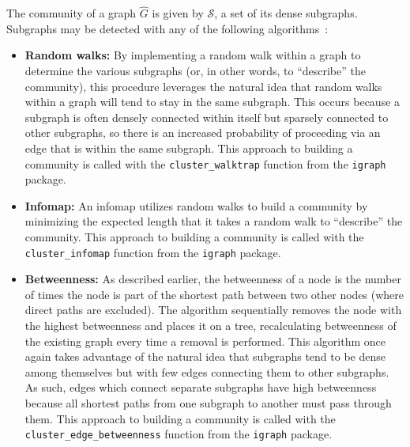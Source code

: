 The community of a graph $\hat{G}$ is given by $\mathcal{S}$, a set of its 
dense subgraphs. Subgraphs may be detected with any of the following 
algorithms~\cite{igraph}:

\tablespacing
\begin{itemize}
	\item \textbf{Random walks:} 
	By implementing a random walk within a graph 
	to determine the various subgraphs (or, in other words, to ``describe'' the 
	community), this procedure leverages the natural idea 
	that random walks within a graph will tend to stay in the same subgraph. 
	This occurs because a subgraph is often densely connected within itself but 
	sparsely connected to other subgraphs, so there is an increased probability 
	of proceeding via an edge that is within the same subgraph.
	This approach to building a community is called with the 
	\texttt{cluster\_walktrap} function from the \texttt{igraph} package.	
	
	\item \textbf{Infomap:} 
	An infomap utilizes random walks to build a 
	community by minimizing the expected length that it takes a random walk 
	to ``describe'' the community.
	This approach to building a community is called with the 
	\texttt{cluster\_infomap} function from the \texttt{igraph} package.
	
	\item \textbf{Betweenness:} 
	As described earlier, the betweenness of a node 
	is the number of times the node is part of the shortest path between two 
	other nodes (where direct paths are excluded). The algorithm sequentially 
	removes the node with the highest betweenness and places it on a tree, 
	recalculating betweenness of the existing graph every time a removal is 
	performed. This algorithm once again takes advantage of the natural idea 
	that subgraphs tend to be dense among themselves but with few edges 
	connecting them to other subgraphs. As such, edges which connect separate 
	subgraphs have high betweenness because all shortest paths from one 
	subgraph to another must pass through them. 
	This approach to building a community is called with the 
	\texttt{cluster\_edge\_betweenness} function from the \texttt{igraph} 
	package.
\end{itemize}
\bodyspacing

